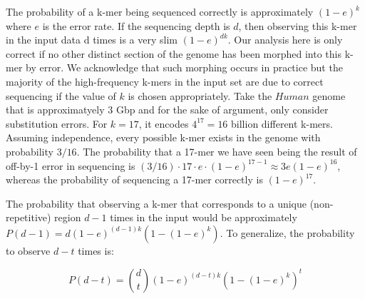 \documentclass[11pt]{article}
\begin{document}
The probability of a k-mer being sequenced correctly is approximately $(1-e)^k$ where $e$ is the error rate. If the sequencing depth is $d$, then observing this k-mer in the input data d times  is a very slim $(1-e)^{dk}$. 
Our analysis here is only correct if no other distinct section of the genome has been morphed into this k-mer by error. 
We acknowledge that such morphing occurs in practice but the majority of the high-frequency k-mers in the input set are due to correct sequencing if the value of $k$ is chosen appropriately. 
Take the $Human$ genome that is approximatyely $3$ Gbp and for the sake of argument, only consider substitution errors. 
For $k=17$, it encodes $4^{17}=16$ billion different k-mers. 
Assuming independence, every possible k-mer exists in the genome with probability $3/16$. 
The probability that a 17-mer we have seen being the result of off-by-1 error in sequencing is $(3/16) \cdot 17 \cdot e \cdot (1-e)^{17-1} \approx 3 e (1-e)^{16}$, whereas the probability of sequencing a 17-mer correctly is $(1-e)^{17}$.

The probability that observing a k-mer that corresponds to a unique (non-repetitive) region $d-1$ times in the input would be approximately $P(d-1) = d (1-e)^{(d-1)k} (1-(1-e)^k)$. 
To generalize, the probability to observe $d-t$ times is:

 $$P(d-t) = {d \choose t} (1-e)^{(d-t)k} (1-(1-e)^k)^t$$
\end{document}
